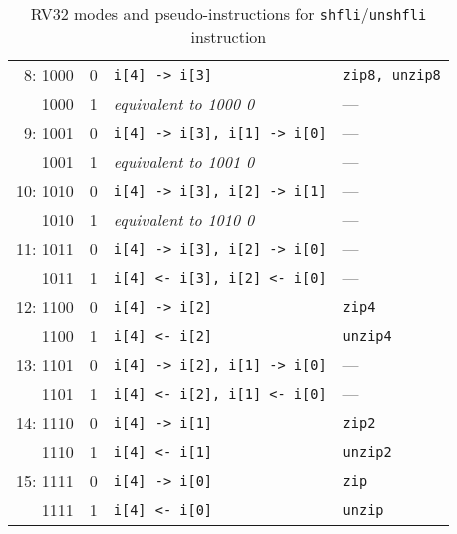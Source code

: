 \begin{table}[h]
\begin{small}
\begin{center}
\begin{tabular}{r c l l}
 8: 1000 & 0 & {\tt i[4] -> i[3]}               & {\tt zip8, unzip8}     \\
    1000 & 1 & {\it equivalent to 1000 0}       & ---                    \\
 9: 1001 & 0 & {\tt i[4] -> i[3], i[1] -> i[0]} & ---                    \\
    1001 & 1 & {\it equivalent to 1001 0}       & ---                    \\
10: 1010 & 0 & {\tt i[4] -> i[3], i[2] -> i[1]} & ---                    \\
    1010 & 1 & {\it equivalent to 1010 0}       & ---                    \\
11: 1011 & 0 & {\tt i[4] -> i[3], i[2] -> i[0]} & ---                    \\
    1011 & 1 & {\tt i[4] <- i[3], i[2] <- i[0]} & ---                    \\

\hline

12: 1100 & 0 & {\tt i[4] -> i[2]}               & {\tt zip4}             \\
    1100 & 1 & {\tt i[4] <- i[2]}               & {\tt unzip4}           \\
13: 1101 & 0 & {\tt i[4] -> i[2], i[1] -> i[0]} & ---                    \\
    1101 & 1 & {\tt i[4] <- i[2], i[1] <- i[0]} & ---                    \\
14: 1110 & 0 & {\tt i[4] -> i[1]}               & {\tt zip2}             \\
    1110 & 1 & {\tt i[4] <- i[1]}               & {\tt unzip2}           \\
15: 1111 & 0 & {\tt i[4] -> i[0]}               & {\tt zip}              \\
    1111 & 1 & {\tt i[4] <- i[0]}               & {\tt unzip}            \\

\end{tabular}
\end{center}
\end{small}
\caption{RV32 modes and pseudo-instructions for {\tt shfli}/{\tt unshfli} instruction}
\label{gzip32-modes}
\end{table}

